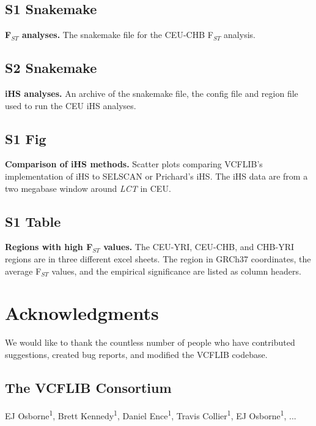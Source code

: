 \documentclass[10pt,letterpaper]{article}
\begin{document}
\subsection*{S1 Snakemake}
\label{S1_snakemake}
{\bf  F$_{ST}$  analyses.}  The snakemake file for the CEU-CHB  F$_{ST}$  analysis.  

\subsection*{S2 Snakemake}
\label{S2_snakemake}
{\bf iHS analyses.}  An archive of the snakemake file, the config file and region file used to run the CEU iHS analyses.

\subsection*{S1 Fig}
\label{S1_Fig}
{\bf Comparison of iHS methods.}  Scatter plots comparing VCFLIB's implementation of iHS to SELSCAN or Prichard's iHS. The iHS data are from a two megabase window around \textit{LCT} in CEU.

\subsection*{S1 Table}
\label{S1_Table}
{\bf Regions with high  F$_{ST}$  values.} The CEU-YRI, CEU-CHB, and CHB-YRI regions are in three different excel sheets.  The region in GRCh37 coordinates, the average  F$_{ST}$  values, and the empirical significance are listed as column headers.

\section*{Acknowledgments}

We would like to thank the countless number of people who have contributed suggestions, created bug reports, and modified the VCFLIB codebase.  

\subsection*{The VCFLIB Consortium}
\newline
\newline
EJ Osborne\textsuperscript{1},
Brett Kennedy\textsuperscript{1},
Daniel Ence\textsuperscript{1},
Travis Collier\textsuperscript{1},
EJ Osborne\textsuperscript{1},
...
\nolinenumbers
\end{document}
